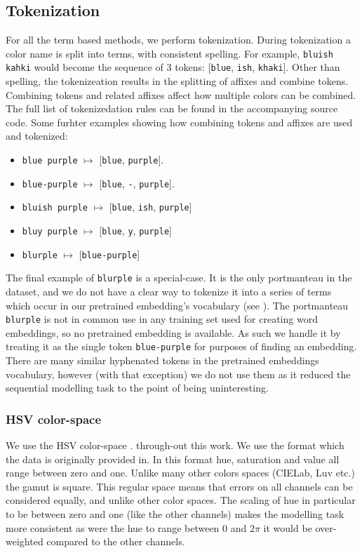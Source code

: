 \documentclass[11pt,a4paper]{article}
\newcommand{\parencite}{\citep}
\newcommand{\natlang}[1]{\texttt{#1}}
\begin{document}
\subsection{Tokenization}
For all the term based methods, we perform tokenization.
During tokenization a color name is split into terms, with consistent spelling.
For example, \natlang{bluish kahki} would become the sequence of 3 tokens: [\natlang{blue}, \natlang{ish}, \natlang{khaki}].
Other than spelling, the tokenizeation results in the splitting of affixes and combine tokens.
Combining tokens and related affixes affect how multiple colors can be combined.
The full list of tokenizedation rules can be found in the accompanying source code.
Some furhter examples showing how combining tokens and affixes are used and tokenized:
\begin{itemize}
	\item \natlang{blue purple} $\mapsto$ [\natlang{blue}, \natlang{purple}].
	\item \natlang{blue-purple} $\mapsto$ [\natlang{blue}, \natlang{-}, \natlang{purple}].
	\item \natlang{bluish purple} $\mapsto$ [\natlang{blue}, \natlang{ish}, \natlang{purple}]
	\item \natlang{bluy purple} $\mapsto$ [\natlang{blue}, \natlang{y}, \natlang{purple}]
	\item \natlang{blurple} $\mapsto$ [\natlang{blue-purple}]
\end{itemize}
The final example of \natlang{blurple} is a special-case.
It is the only portmanteau in the dataset, and we do not have a clear way to tokenize it into a series of terms which occur in our pretrained embedding's vocabulary (see ).
The portmanteau \natlang{blurple} is not in common use in any training set used for creating word embeddings, so no pretrained embedding is available.
As such we handle it by treating it as the single token \natlang{blue-purple} for purposes of finding an embedding.
There are many similar hyphenated tokens in the pretrained embeddings vocabulary, however (with that exception) we do not use them as it reduced the sequential modelling task to the point of being uninteresting.



\subsubsection{HSV color-space}
We use the HSV color-space \parencite{smith1978color}.
through-out this work.
We use the format which the data is originally provided in.
In this format hue, saturation and value all range between zero and one.
Unlike many other colors spaces (CIELab, Luv etc.) the gamut is square.
This regular space means that errors on all channels can be considered equally, and unlike other color spaces.
The scaling of hue in particular to be between zero and one (like the other channels) makes the modelling task more consistent as were the hue to range between $0$ and $2\pi$ it would be over-weighted compared to the other channels.
\end{document}
